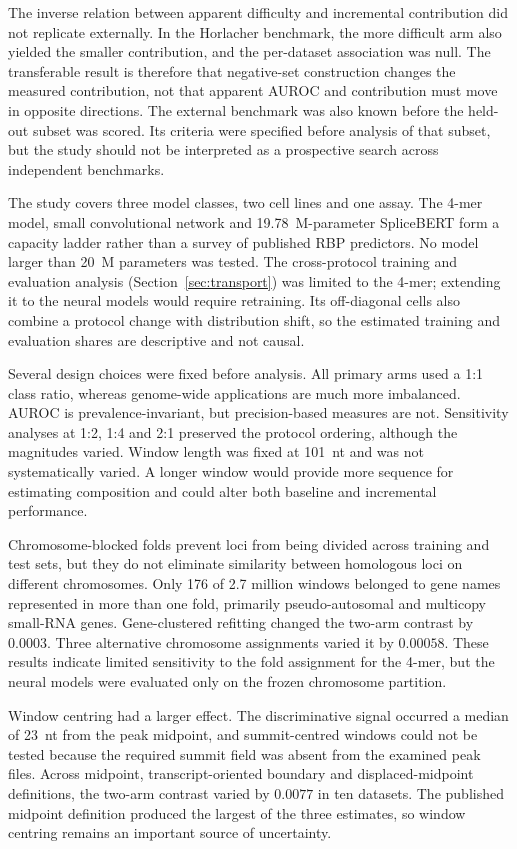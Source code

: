 The inverse relation between apparent difficulty and incremental contribution did not replicate
externally. In the Horlacher benchmark, the more difficult arm also yielded the smaller
contribution, and the per-dataset association was null. The transferable result is therefore
that negative-set construction changes the measured contribution, not that apparent AUROC and
contribution must move in opposite directions. The external benchmark was also known before the
held-out subset was scored. Its criteria were specified before analysis of that subset, but the
study should not be interpreted as a prospective search across independent benchmarks.

The study covers three model classes, two cell lines and one assay. The 4-mer model, small
convolutional network and 19.78~M-parameter SpliceBERT form a capacity ladder rather than a
survey of published RBP predictors. No model larger than 20~M parameters was tested. The
cross-protocol training and evaluation analysis (Section~\ref{sec:transport}) was limited to the
4-mer; extending it to the neural models would require retraining. Its off-diagonal cells also combine a protocol change
with distribution shift, so the estimated training and evaluation shares are descriptive and
not causal.

Several design choices were fixed before analysis. All primary arms used a 1:1 class ratio,
whereas genome-wide applications are much more imbalanced. AUROC is prevalence-invariant, but
precision-based measures are not. Sensitivity analyses at 1:2, 1:4 and 2:1 preserved the
protocol ordering, although the magnitudes varied. Window length was fixed at 101~nt and was not
systematically varied. A longer window would provide more sequence for estimating composition
and could alter both baseline and incremental performance.

Chromosome-blocked folds prevent loci from being divided across training and test sets, but they
do not eliminate similarity between homologous loci on different chromosomes. Only 176 of
2.7 million windows belonged to gene names represented in more than one fold, primarily
pseudo-autosomal and multicopy small-RNA genes. Gene-clustered refitting changed the two-arm
contrast by $0.0003$. Three alternative chromosome assignments varied it by $0.00058$. These
results indicate limited sensitivity to the fold assignment for the 4-mer, but the neural models
were evaluated only on the frozen chromosome partition.

Window centring had a larger effect. The discriminative signal occurred a median of 23~nt from
the peak midpoint, and summit-centred windows could not be tested because the required summit
field was absent from the examined peak files. Across midpoint, transcript-oriented boundary
and displaced-midpoint definitions, the two-arm contrast varied by $0.0077$ in ten datasets.
The published midpoint definition produced the largest of the three estimates, so window
centring remains an important source of uncertainty.

